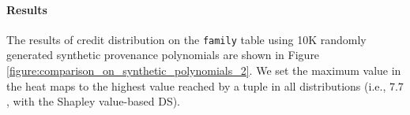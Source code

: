 \paragraph{Results} The results of credit distribution on the \texttt{family} table using 10K randomly generated synthetic provenance polynomials are shown in
Figure \ref{figure:comparison_on_synthetic_polynomials_2}. 
We set the maximum value in the heat maps to the highest value reached by a tuple in all  distributions (i.e., $7.7$, with the Shapley value-based DS). 



